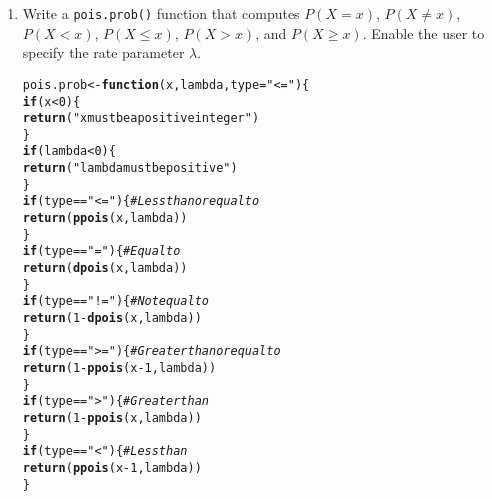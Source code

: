 \documentclass{article}\usepackage[]{graphicx}\usepackage[]{xcolor}
\makeatletter
\newcommand{\hlnum}[1]{\textcolor[rgb]{0.686,0.059,0.569}{#1}}%
\newcommand{\hlsng}[1]{\textcolor[rgb]{0.192,0.494,0.8}{#1}}%
\newcommand{\hlcom}[1]{\textcolor[rgb]{0.678,0.584,0.686}{\textit{#1}}}%
\newcommand{\hlopt}[1]{\textcolor[rgb]{0,0,0}{#1}}%
\newcommand{\hldef}[1]{\textcolor[rgb]{0.345,0.345,0.345}{#1}}%
\newcommand{\hlkwa}[1]{\textcolor[rgb]{0.161,0.373,0.58}{\textbf{#1}}}%
\newcommand{\hlkwb}[1]{\textcolor[rgb]{0.69,0.353,0.396}{#1}}%
\newcommand{\hlkwc}[1]{\textcolor[rgb]{0.333,0.667,0.333}{#1}}%
\newcommand{\hlkwd}[1]{\textcolor[rgb]{0.737,0.353,0.396}{\textbf{#1}}}%
\newenvironment{kframe}{%
 \def\at@end@of@kframe{}%
 \ifinner\ifhmode%
  \def\at@end@of@kframe{\end{minipage}}%
  \begin{minipage}{\columnwidth}%
 \fi\fi%
 \def\FrameCommand##1{\hskip\@totalleftmargin \hskip-\fboxsep
 \colorbox{shadecolor}{##1}\hskip-\fboxsep
     \hskip-\linewidth \hskip-\@totalleftmargin \hskip\columnwidth}%
 \MakeFramed {\advance\hsize-\width
   \@totalleftmargin\z@ \linewidth\hsize
   \@setminipage}}%
 {\par\unskip\endMakeFramed%
 \at@end@of@kframe}
\newenvironment{knitrout}{}{} %
\makeatother
\begin{document}
  \begin{enumerate}
    \item Write a \texttt{pois.prob()} function that computes $P(X=x)$, 
    $P(X \neq x)$, $P(X<x)$, $P(X \leq x)$, $P(X > x)$, and $P(X \geq x).$ Enable the user to specify the rate parameter $\lambda$.
\begin{knitrout}\scriptsize
{}\color{fgcolor}\begin{kframe}
\begin{alltt}
\hldef{pois.prob} \hlkwb{<-} \hlkwa{function}\hldef{(}\hlkwc{x}\hldef{,} \hlkwc{lambda}\hldef{,} \hlkwc{type}\hldef{=}\hlsng{"<="}\hldef{)\{}
  \hlkwa{if}\hldef{(x}\hlopt{<}\hlnum{0}\hldef{)\{}
    \hlkwd{return}\hldef{(}\hlsng{"x must be a positive integer"}\hldef{)}
  \hldef{\}}
  \hlkwa{if}\hldef{(lambda}\hlopt{<}\hlnum{0}\hldef{)\{}
    \hlkwd{return}\hldef{(}\hlsng{"lambda must be positive"}\hldef{)}
  \hldef{\}}
  \hlkwa{if}\hldef{(type} \hlopt{==} \hlsng{"<="}\hldef{)\{}\hlcom{#Less than or equal to}
    \hlkwd{return}\hldef{(}\hlkwd{ppois}\hldef{(x,lambda))}
  \hldef{\}}
  \hlkwa{if}\hldef{(type} \hlopt{==} \hlsng{"="}\hldef{)\{}\hlcom{#Equal to}
    \hlkwd{return}\hldef{(}\hlkwd{dpois}\hldef{(x,lambda))}
  \hldef{\}}
  \hlkwa{if}\hldef{(type} \hlopt{==} \hlsng{"!="}\hldef{)\{}\hlcom{#Not equal to}
    \hlkwd{return}\hldef{(}\hlnum{1}\hlopt{-}\hlkwd{dpois}\hldef{(x,lambda))}
    \hldef{\}}
  \hlkwa{if}\hldef{(type} \hlopt{==} \hlsng{">="}\hldef{)\{}\hlcom{# Greater than or equal to}
    \hlkwd{return}\hldef{(}\hlnum{1}\hlopt{-}\hlkwd{ppois}\hldef{(x}\hlopt{-}\hlnum{1}\hldef{,lambda))}
    \hldef{\}}
  \hlkwa{if}\hldef{(type} \hlopt{==} \hlsng{">"}\hldef{)\{}\hlcom{# Greater than}
    \hlkwd{return}\hldef{(}\hlnum{1}\hlopt{-}\hlkwd{ppois}\hldef{(x,lambda))}
  \hldef{\}}
  \hlkwa{if}\hldef{(type} \hlopt{==} \hlsng{"<"}\hldef{)\{}\hlcom{#Less than}
    \hlkwd{return}\hldef{(}\hlkwd{ppois}\hldef{(x}\hlopt{-}\hlnum{1}\hldef{,lambda))}
    \hldef{\}}



\end{alltt}
\end{kframe}
\end{knitrout}
\end{enumerate}
\end{document}
